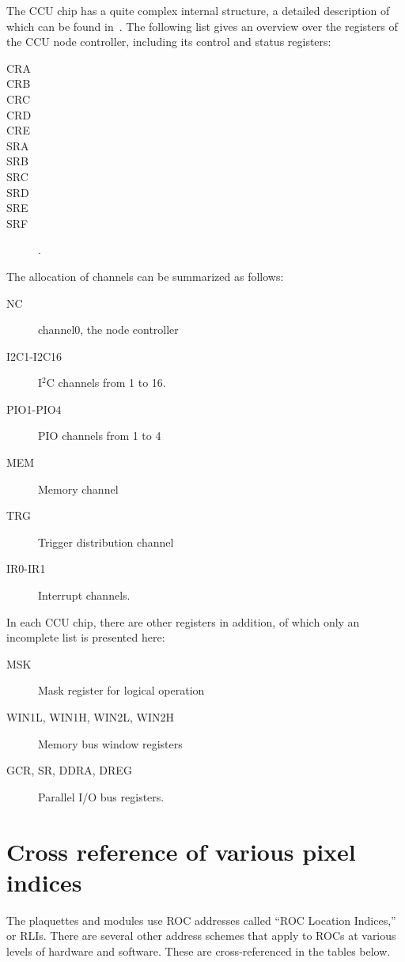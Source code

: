 \documentclass{cmspaper}
\begin{document}
\begin{appendix}
The CCU chip has a quite complex internal structure, a detailed description 
of which can be found in~\cite{CCU}. 
The following list gives an overview over the registers of the CCU node controller,
including its control and status registers:
\begin{description}
\item[CRA]
\item[CRB]
\item[CRC]
\item[CRD]
\item[CRE]
\item[SRA]
\item[SRB]
\item[SRC]
\item[SRD]
\item[SRE]
\item[SRF] .
\end{description}
The allocation of channels can be summarized as follows:
\begin{description}
\item[NC] channel0, the node controller
\item[I2C1-I2C16] I$^2$C channels from 1 to 16. 
\item[PIO1-PIO4] PIO channels from 1 to 4 
\item[MEM] Memory channel
\item[TRG] Trigger distribution channel
\item[IR0-IR1] Interrupt channels.
\end{description}

In each CCU chip, there are other registers in addition, 
of which only an incomplete list is presented here:
\begin{description}
\item[MSK] Mask register for logical operation
\item[WIN1L, WIN1H, WIN2L, WIN2H] Memory bus window registers 
\item[GCR, SR, DDRA, DREG] Parallel I/O bus registers.
\end{description}


\section{Cross reference of various pixel indices}
\label{app:CrossReferencePixelIndices}

The plaquettes and modules use ROC addresses called ``ROC Location Indices,'' or RLIs.
There are several other address schemes  that apply to ROCs at various levels of hardware and
software. These are cross-referenced in the tables below.


\end{appendix}
\end{document}

